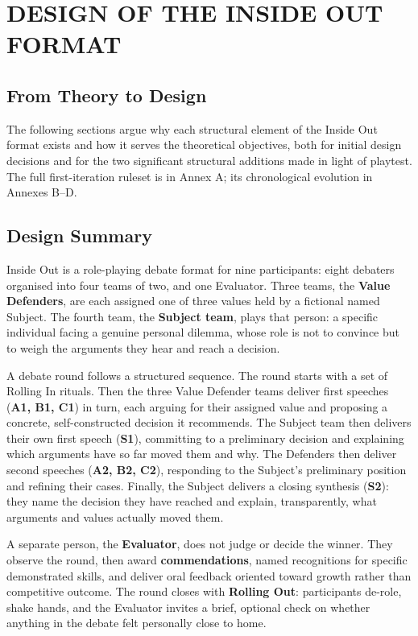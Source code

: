\section{DESIGN OF THE INSIDE OUT FORMAT}
\label{sec:design}

\subsection{From Theory to Design}

The following sections argue why each structural element of the Inside Out format exists and how it serves the theoretical objectives, both for initial design decisions and for the two significant structural additions made in light of playtest. The full first-iteration ruleset is in Annex A; its chronological evolution in Annexes B--D.

\subsection{Design Summary}

Inside Out is a role-playing debate format for nine participants: eight debaters organised into four teams of two, and one Evaluator. Three teams, the \textbf{Value Defenders}, are each assigned one of three values held by a fictional named Subject. The fourth team, the \textbf{Subject team}, plays that person: a specific individual facing a genuine personal dilemma, whose role is not to convince but to weigh the arguments they hear and reach a decision.

A debate round follows a structured sequence. The round starts with a set of Rolling In rituals. Then the three Value Defender teams deliver first speeches (\textbf{A1, B1, C1}) in turn, each arguing for their assigned value and proposing a concrete, self-constructed decision it recommends. The Subject team then delivers their own first speech (\textbf{S1}), committing to a preliminary decision and explaining which arguments have so far moved them and why. The Defenders then deliver second speeches (\textbf{A2, B2, C2}), responding to the Subject's preliminary position and refining their cases. Finally, the Subject delivers a closing synthesis (\textbf{S2}): they name the decision they have reached and explain, transparently, what arguments and values actually moved them.

A separate person, the \textbf{Evaluator}, does not judge or decide the winner. They observe the round, then award \textbf{commendations}, named recognitions for specific demonstrated skills, and deliver oral feedback oriented toward growth rather than competitive outcome. The round closes with \textbf{Rolling Out}: participants de-role, shake hands, and the Evaluator invites a brief, optional check on whether anything in the debate felt personally close to home.


